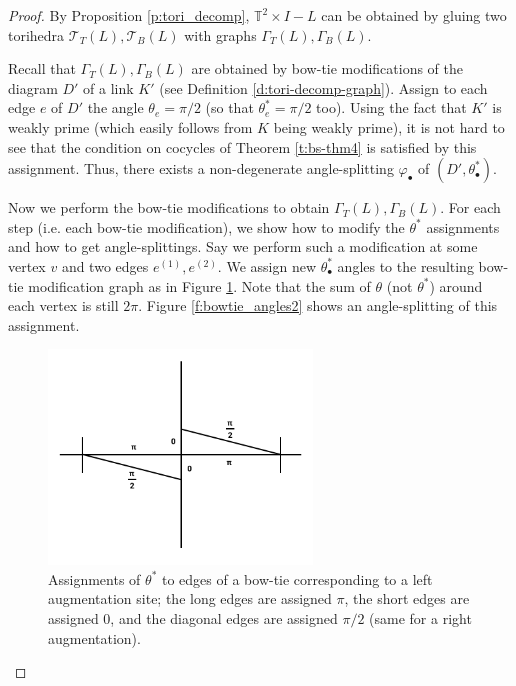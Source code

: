 \documentclass[11pt]{amsart}
\newcommand{\thmref}[1]{Theorem \ref{#1}}
\newcommand{\prpref}[1]{Proposition \ref{#1}}
\newcommand{\defref}[1]{Definition \ref{#1}}
\newcommand{\figref}[1]{Figure \ref{#1}}
\newcommand{\torus}{{\mathbb{T}^2}}
\newcommand{\sT}{{\mathcal{T}}}
\newcommand{\vphi}{\varphi}
\newcommand{\toruscomp}[1]{{\torus \times I - #1}}
\theoremstyle{plain}
\theoremstyle{definition}
\begin{document}
\begin{proof}
By \prpref{p:tori_decomp}, $\toruscomp{L}$ can be
obtained by gluing two torihedra $\sT_T(L),\sT_B(L)$
with graphs $\Gamma_T(L),\Gamma_B(L)$.


Recall that $\Gamma_T(L),\Gamma_B(L)$ are
obtained by bow-tie modifications of the diagram $D'$
of a link $K'$
(see \defref{d:tori-decomp-graph}).
Assign to each edge $e$ of $D'$ the angle $\theta_e = \pi/2$
(so that $\theta_e^* = \pi/2$ too).
Using the fact that $K'$ is weakly prime
(which easily follows from $K$ being weakly prime),
it is not hard to see that the condition on cocycles
of \thmref{t:bs-thm4} is satisfied by this assignment.
Thus, there exists a non-degenerate angle-splitting
$\vphi_\bullet$ of $(D',\theta_\bullet^*)$.


Now we perform the bow-tie modifications to obtain
$\Gamma_T(L),\Gamma_B(L)$.
For each step (i.e. each bow-tie modification),
we show how to modify the $\theta^*$ assignments
and how to get angle-splittings.
Say we perform such a modification
at some vertex $v$ and two edges $e^{(1)},e^{(2)}$.
We assign new $\theta_\bullet^*$ angles to
the resulting bow-tie modification graph
as in \figref{f:bowtie_angles}.
Note that the sum of $\theta$ (not $\theta^*$)
around each vertex is still $2\pi$.
\figref{f:bowtie_angles2} shows an angle-splitting
of this assignment.


\begin{figure}
\includegraphics[width=7cm]{horizontal_bowtie.png}
\caption{Assignments of $\theta^*$ to edges of a bow-tie
	corresponding to a left augmentation site;
	the long edges are assigned $\pi$,
	the short edges are assigned 0,
	and the diagonal edges are assigned $\pi/2$
	(same for a right augmentation).
	}
\label{f:bowtie_angles}
\end{figure}


\end{proof}
\end{document}
